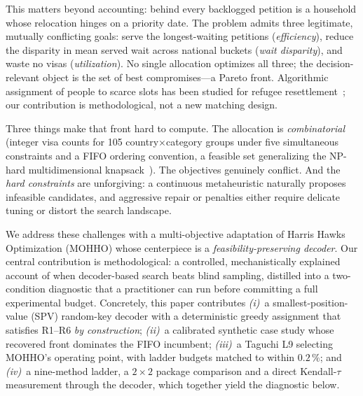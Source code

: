 \documentclass[runningheads]{llncs}
\begin{document}
This matters beyond accounting: behind every backlogged petition is a household whose relocation hinges on a priority date. The problem admits three legitimate, mutually conflicting goals: serve the longest-waiting petitions (\emph{efficiency}), reduce the disparity in mean served wait across national buckets (\emph{wait disparity}), and waste no visas (\emph{utilization}). No single allocation optimizes all three; the decision-relevant object is the set of best compromises---a Pareto front. Algorithmic assignment of people to scarce slots has been studied for refugee resettlement~\cite{bansak}; our contribution is methodological, not a new matching design.

Three things make that front hard to compute. The allocation is \emph{combinatorial} (integer visa counts for 105 country$\times$category groups under five simultaneous constraints and a FIFO ordering convention, a feasible set generalizing the NP-hard multidimensional knapsack~\cite{garey}). The objectives genuinely conflict. And the \emph{hard constraints} are unforgiving: a continuous metaheuristic naturally proposes infeasible candidates, and aggressive repair or penalties either require delicate tuning or distort the search landscape.

We address these challenges with a multi-objective adaptation of Harris Hawks Optimization (MOHHO) whose centerpiece is a \emph{feasibility-preserving decoder}. Our central contribution is methodological: a controlled, mechanistically explained account of when decoder-based search beats blind sampling, distilled into a two-condition diagnostic that a practitioner can run before committing a full experimental budget. Concretely, this paper contributes \emph{(i)}~a smallest-position-value (SPV) random-key decoder with a deterministic greedy assignment that satisfies R1--R6 \emph{by construction}; \emph{(ii)}~a calibrated synthetic case study whose recovered front dominates the FIFO incumbent; \emph{(iii)}~a Taguchi L9 selecting MOHHO's operating point, with ladder budgets matched to within $0.2\,\%$; and \emph{(iv)}~a nine-method ladder, a $2\times2$ package comparison and a direct Kendall-$\tau$ measurement through the decoder, which together yield the diagnostic below.
\end{document}
